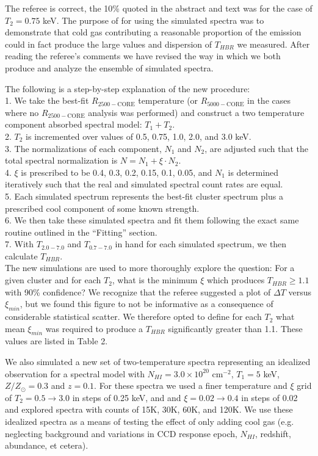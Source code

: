 \documentclass[11pt]{article}
\begin{document}
The referee is correct, the 10\% quoted in the abstract and text was
for the case of $T_2 = 0.75$ keV. The purpose of for using the simulated
spectra was to demonstrate that cold gas contributing a reasonable
proportion of the emission could in fact produce the large values and
dispersion of $T_{HBR}$ we measured. After reading the referee's
comments we have revised the way in which we both produce and analyze
the ensemble of simulated spectra.

The following is a step-by-step explanation of the new procedure:\\
1. We take the best-fit $R_{2500-\mathrm{CORE}}$ temperature (or
$R_{5000-\mathrm{CORE}}$ in the cases where no
$R_{2500-\mathrm{CORE}}$ analysis was performed) and construct a two
temperature component absorbed spectral model: $T_1 + T_2$.\\
2. $T_2$ is incremented over values of 0.5, 0.75, 1.0, 2.0, and 3.0
keV.\\
3. The normalizations of each component, $N_1$ and $N_2$, are
adjusted such that the total spectral normalization is $N = N_1 + \xi
\cdot N_2$.\\
4. $\xi$ is prescribed to be 0.4, 0.3, 0.2, 0.15, 0.1, 0.05, and
$N_1$ is determined iteratively such that the real and simulated
spectral count rates are equal.\\
5. Each simulated spectrum represents the best-fit cluster spectrum
plus a prescribed cool component of some known strength.\\
6. We then take these simulated spectra and fit them following the
exact same routine outlined in the ``Fitting'' section.\\
7. With $T_{2.0-7.0}$ and $T_{0.7-7.0}$ in hand for each simulated
spectrum, we then calculate $T_{HBR}$.\\

The new simulations are used to more thoroughly explore the question:
For a given cluster and for each $T_2$, what is the minimum $\xi$
which produces $T_{HBR} \geq 1.1$ with 90\% confidence? We
recognize that the referee suggested a plot of $\Delta T$ versus
$\xi_{min}$, but we found this figure to not be informative as a
consequence of considerable statistical scatter. We therefore opted to
define for each $T_2$ what mean $\xi_{min}$ was required to produce
a $T_{HBR}$ significantly greater than 1.1. These values are listed in
Table 2.

We also simulated a new set of two-temperature spectra
representing an idealized observation for a spectral model with
$N_{HI} = 3.0\times10^{20}$ cm$^{-2}$, $T_1 = 5$ keV, $Z/Z_{\odot} =
0.3$ and $z = 0.1$. For these spectra we used a finer temperature and
$\xi$ grid of $T_2 = 0.5 \rightarrow 3.0$ in steps of 0.25 keV, and
and $\xi = 0.02 \rightarrow 0.4$ in steps of 0.02 and explored spectra
with counts of 15K, 30K, 60K, and 120K. We use these idealized spectra
as a means of testing the effect of only adding cool gas
(e.g. neglecting background and variations in CCD response epoch,
$N_{HI}$, redshift, abundance, et cetera).
\end{document}
